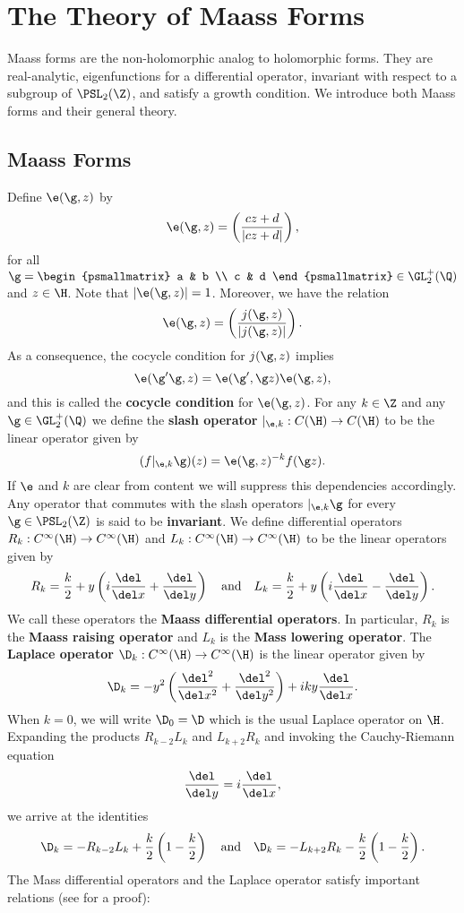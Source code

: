 \chapter{The Theory of Maass Forms}
	Maass forms are the non-holomorphic analog to holomorphic forms. They are real-analytic, eigenfunctions for a differential operator, invariant with respect to a subgroup of $\PSL_{2}(\Z)$, and satisfy a growth condition. We introduce both Maass forms and their general theory.
  \section{Maass Forms}
    Define $\e(\g,z)$ by
    \[
      \e(\g,z) = \left(\frac{cz+d}{|cz+d|}\right),
    \]
    for all $\g = \begin{psmallmatrix} a & b \\ c & d \end{psmallmatrix} \in \GL_{2}^{+}(\Q)$ and $z \in \H$. Note that $|\e(\g,z)| = 1$. Moreover, we have the relation
    \[
      \e(\g,z) = \left(\frac{j(\g,z)}{|j(\g,z)|}\right).
    \]
    As a consequence, the cocycle condition for $j(\g,z)$ implies
    \[
      \e(\g'\g,z) =  \e(\g',\g z)\e(\g,z),
    \]
    and this is called the \textbf{cocycle condition} for $\e(\g,z)$. For any $k \in \Z$ and any $\g \in \GL_{2}^{+}(\Q)$ we define the \textbf{slash operator} $|_{\e,k}:C(\H) \to C(\H)$ to be the linear operator given by
    \[
      (f|_{\e,k}\g)(z) = \e(\g,z)^{-k}f(\g z).
    \]
    If $\e$ and $k$ are clear from content we will suppress this dependencies accordingly. Any operator that commutes with the slash operators $|_{\e,k}\g$ for every $\g \in \PSL_{2}(\Z)$ is said to be \textbf{invariant}. We define differential operators $R_{k}:C^{\infty}(\H) \to C^{\infty}(\H)$ and $L_{k}:C^{\infty}(\H) \to C^{\infty}(\H)$ to be the linear operators given by
    \[
      R_{k} = \frac{k}{2}+y\left(i\frac{\del}{\del x}+\frac{\del}{\del y}\right) \quad \text{and} \quad L_{k} = \frac{k}{2}+y\left(i\frac{\del}{\del x}-\frac{\del}{\del y}\right).
    \]
    We call these operators the \textbf{Maass differential operators}. In particular, $R_{k}$ is the \textbf{Maass raising operator} and $L_{k}$ is the \textbf{Mass lowering operator}. The \textbf{Laplace operator} $\D_{k}:C^{\infty}(\H) \to C^{\infty}(\H)$ is the linear operator given by
    \[
      \D_{k} = -y^{2}\left(\frac{\del^{2}}{\del x^{2}}+\frac{\del^{2}}{\del y^{2}}\right)+iky\frac{\del}{\del x}.
    \]
    When $k = 0$, we will write $\D_{0} = \D$ which is the usual Laplace operator on $\H$. Expanding the products $R_{k-2}L_{k}$ and $L_{k+2}R_{k}$ and invoking the Cauchy-Riemann equation
    \[
      \frac{\del}{\del y} = i\frac{\del}{\del x},
    \]
    we arrive at the identities
    \[
      \D_{k} = -R_{k-2}L_{k}+\frac{k}{2}\left(1-\frac{k}{2}\right) \quad \text{and} \quad \D_{k} = -L_{k+2}R_{k}-\frac{k}{2}\left(1-\frac{k}{2}\right).
    \]
     The Mass differential operators and the Laplace operator satisfy important relations (see \cite{bumpautomorphic1997} for a proof):

